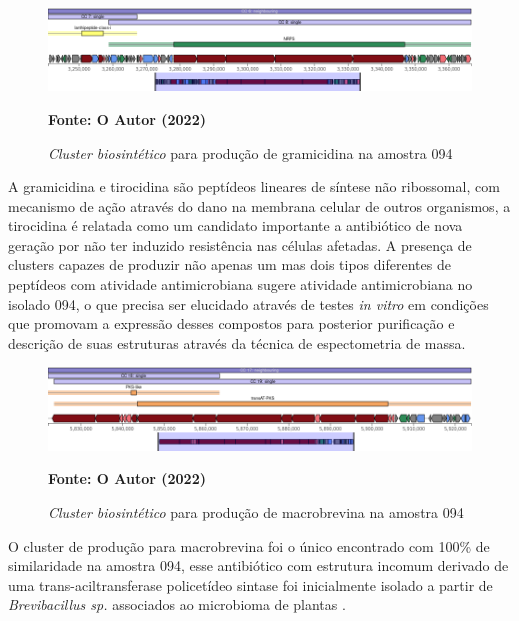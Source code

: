 \begin{figure}[H]
	\caption{\textit{Cluster biosintético} para produção de gramicidina na amostra 094}
	\label{fig:quast_16}
	\centering
		\includegraphics[width=0.8\linewidth]{imagens/antismash/094regiao3.png} \\
	\centering
    \begin{small}\textbf{Fonte: O Autor (2022)}\end{small}
\end{figure}
\vspace{\floatsep}

A gramicidina e tirocidina são peptídeos lineares de síntese não ribossomal, com mecanismo de ação
através do dano na membrana celular de outros organismos, a tirocidina é relatada como um candidato importante
a antibiótico de nova geração por não ter induzido resistência nas células afetadas\cite{yang2018antimicrobial}.
A presença de clusters capazes de produzir não apenas um mas dois tipos diferentes de peptídeos com
atividade antimicrobiana sugere atividade antimicrobiana no isolado 094, o que precisa ser elucidado através
de testes \textit{in vitro} em condições que promovam a expressão desses compostos para posterior purificação e
descrição de suas estruturas através da técnica de espectometria de massa.

\begin{figure}[H]
	\caption{\textit{Cluster biosintético} para produção de macrobrevina na amostra 094}
	\label{fig:quast_16}
	\centering
		\includegraphics[width=0.8\linewidth]{imagens/antismash/094regiao4.png} \\
	\centering
    \begin{small}\textbf{Fonte: O Autor (2022)}\end{small}
\end{figure}
\vspace{\floatsep}

O cluster de produção para macrobrevina foi o único encontrado com 100\% de similaridade na amostra
094, esse antibiótico com estrutura incomum derivado de uma trans-aciltransferase policetídeo sintase foi inicialmente isolado
a partir de \textit{Brevibacillus sp.} associados ao microbioma de plantas \cite{helfrich2018bipartite}.

